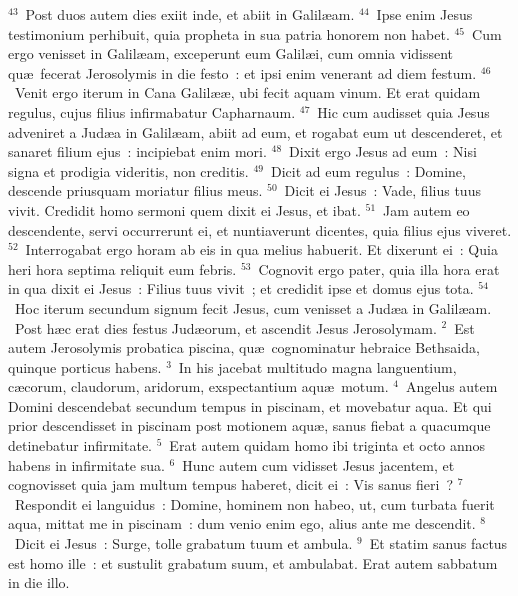 ${}^{43}$~Post duos autem dies exiit inde, et abiit in Galil\ae am.
${}^{44}$~Ipse enim Jesus testimonium perhibuit, quia propheta in sua patria honorem non habet.
${}^{45}$~Cum ergo venisset in Galil\ae am, exceperunt eum Galil\ae i, cum omnia vidissent qu\ae\ fecerat Jerosolymis in die festo~: et ipsi enim venerant ad diem festum.
${}^{46}$~Venit ergo iterum in Cana Galil\ae \ae , ubi fecit aquam vinum. Et erat quidam regulus, cujus filius infirmabatur Capharnaum.
${}^{47}$~Hic cum audisset quia Jesus adveniret a Jud\ae a in Galil\ae am, abiit ad eum, et rogabat eum ut descenderet, et sanaret filium ejus~: incipiebat enim mori.
${}^{48}$~Dixit ergo Jesus ad eum~: Nisi signa et prodigia videritis, non creditis.
${}^{49}$~Dicit ad eum regulus~: Domine, descende priusquam moriatur filius meus.
${}^{50}$~Dicit ei Jesus~: Vade, filius tuus vivit. Credidit homo sermoni quem dixit ei Jesus, et ibat.
${}^{51}$~Jam autem eo descendente, servi occurrerunt ei, et nuntiaverunt dicentes, quia filius ejus viveret.
${}^{52}$~Interrogabat ergo horam ab eis in qua melius habuerit. Et dixerunt ei~: Quia heri hora septima reliquit eum febris.
${}^{53}$~Cognovit ergo pater, quia illa hora erat in qua dixit ei Jesus~: Filius tuus vivit~; et credidit ipse et domus ejus tota.
${}^{54}$~Hoc iterum secundum signum fecit Jesus, cum venisset a Jud\ae a in Galil\ae am.
~Post h\ae c erat dies festus Jud\ae orum, et ascendit Jesus Jerosolymam.
${}^{2}$~Est autem Jerosolymis probatica piscina, qu\ae\ cognominatur hebraice Bethsaida, quinque porticus habens.
${}^{3}$~In his jacebat multitudo magna languentium, c\ae corum, claudorum, aridorum, exspectantium aqu\ae\ motum.
${}^{4}$~Angelus autem Domini descendebat secundum tempus in piscinam, et movebatur aqua. Et qui prior descendisset in piscinam post motionem aqu\ae , sanus fiebat a quacumque detinebatur infirmitate.
${}^{5}$~Erat autem quidam homo ibi triginta et octo annos habens in infirmitate sua.
${}^{6}$~Hunc autem cum vidisset Jesus jacentem, et cognovisset quia jam multum tempus haberet, dicit ei~: Vis sanus fieri~?
${}^{7}$~Respondit ei languidus~: Domine, hominem non habeo, ut, cum turbata fuerit aqua, mittat me in piscinam~: dum venio enim ego, alius ante me descendit.
${}^{8}$~Dicit ei Jesus~: Surge, tolle grabatum tuum et ambula.
${}^{9}$~Et statim sanus factus est homo ille~: et sustulit grabatum suum, et ambulabat. Erat autem sabbatum in die illo.



